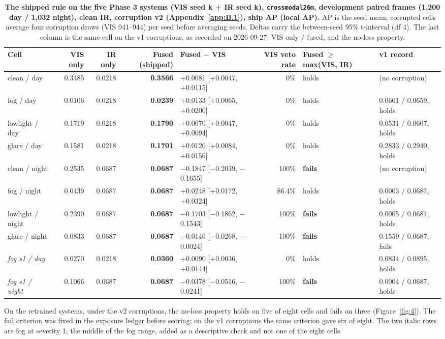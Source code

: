 \documentclass[10pt]{article}
\begin{document}
\begin{table}[htbp]
\centering
\footnotesize
\caption{\textbf{The shipped rule on the five Phase 3 systems (VIS seed k + IR seed k), \texttt{crossmodal26m}, development paired frames (1,200 day / 1,032 night), clean IR, corruption v2 (Appendix~\ref{app:B.1}), ship AP (local AP).} AP is the seed mean; corrupted cells average four corruption draws (VIS 941--944) per seed before averaging seeds. Deltas carry the between-seed 95\% t-interval (df 4). The last column is the same cell on the v1 corruptions, as recorded on 2026-09-27: VIS only / fused, and the no-loss property.}
\label{tab:7}
\setlength{\tabcolsep}{3pt}
\begin{adjustbox}{max width=\linewidth}
\begin{tabular}{lrrrlrll}
\toprule
Cell & VIS only & IR only & Fused (shipped) & Fused $-$ VIS & VIS veto rate & Fused $\geq$ max(VIS, IR) & v1 record \\
\midrule
clean / day & 0.3485 & 0.0218 & \textbf{0.3566} & +0.0081 [+0.0047, +0.0115] & 0\% & holds & (no corruption) \\
fog / day & 0.0106 & 0.0218 & \textbf{0.0239} & +0.0133 [+0.0065, +0.0200] & 0\% & holds & 0.0601 / 0.0659, holds \\
lowlight / day & 0.1719 & 0.0218 & \textbf{0.1790} & +0.0070 [+0.0047, +0.0094] & 0\% & holds & 0.0531 / 0.0607, holds \\
glare / day & 0.1581 & 0.0218 & \textbf{0.1701} & +0.0120 [+0.0084, +0.0156] & 0\% & holds & 0.2833 / 0.2940, holds \\
clean / night & 0.2535 & 0.0687 & \textbf{0.0687} & $-$0.1847 [$-$0.2039, $-$0.1655] & 100\% & \textbf{fails} & (no corruption) \\
fog / night & 0.0439 & 0.0687 & \textbf{0.0687} & +0.0248 [+0.0172, +0.0324] & 86.4\% & holds & 0.0003 / 0.0687, holds \\
lowlight / night & 0.2390 & 0.0687 & \textbf{0.0687} & $-$0.1703 [$-$0.1862, $-$0.1543] & 100\% & \textbf{fails} & 0.0005 / 0.0687, holds \\
glare / night & 0.0833 & 0.0687 & \textbf{0.0687} & $-$0.0146 [$-$0.0268, $-$0.0024] & 100\% & \textbf{fails} & 0.1559 / 0.0687, fails \\
\emph{fog s1 / day} & 0.0270 & 0.0218 & \textbf{0.0360} & +0.0090 [+0.0036, +0.0144] & 0\% & holds & 0.0834 / 0.0895, holds \\
\emph{fog s1 / night} & 0.1066 & 0.0687 & \textbf{0.0687} & $-$0.0378 [$-$0.0516, $-$0.0241] & 100\% & \textbf{fails} & 0.0004 / 0.0687, holds \\
\bottomrule
\end{tabular}
\end{adjustbox}
\end{table}
On the retrained systems, under the v2 corruptions, the no-loss property holds on five of eight cells and fails on three (Figure~\ref{fig:4}). The fail criterion was fixed in the exposure ledger before scoring; on the v1 corruptions the same criterion gave six of eight. The two italic rows are fog at severity 1, the middle of the fog range, added as a descriptive check and not one of the eight cells.
\end{document}
